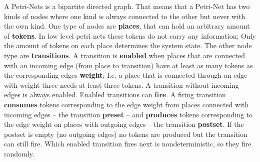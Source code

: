 A Petri-Nets is a bipartite directed graph.
That means that a Petri-Net has two kinds of nodes where one kind is always connected to the other but never with the own kind.
One type of nodes are \textbf{places}, that can hold an arbitrary amount of \textbf{tokens}.
In low level petri nets these tokens do not carry any information; 
Only the amount of tokens on each place determines the system state.
The other node type are \textbf{transitions}.
A transition is \textbf{enabled} when places that are connected with an incoming edge (from place to transition) have at least as many tokens as the corresponding edges \textbf{weight};
I.e. a place that is connected through an edge with weight three needs at least three tokens.
A transition without incoming edges is always enabled.
Enabled transitions can \textbf{fire}.
A firing transition \textbf{consumes} tokens corresponding to the edge weight from places connected with incoming edges -- the transition \textbf{preset} -- and \textbf{produces} tokens corresponding to the edge weight on places with outgoing edges -- the transition \textbf{postset}.
If the postset is empty (no outgoing edges) no tokens are produced but the transition can still fire.
Which enabled transition fires next is nondeterministic, so they fire randomly.

